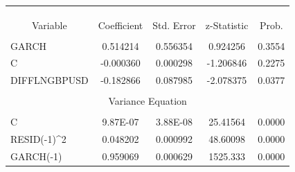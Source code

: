 \documentclass[11pt]{report}
\begin{document}
\begin{table}[!h]
\begin{tabular}{lcccc}
\multicolumn{1}{c}{}           &                                  &                                 &                                  &                            \\
\multicolumn{1}{c}{}           &                                  &                                 &                                  &                            \\
\multicolumn{1}{c}{}           &                                  &                                 &                                  &                            \\ \hline
\multicolumn{1}{|c|}{Variable} & \multicolumn{1}{c|}{Coefficient} & \multicolumn{1}{c|}{Std. Error} & \multicolumn{1}{c|}{z-Statistic} & \multicolumn{1}{c|}{Prob.} \\ \hline
\multicolumn{1}{c}{}           &                                  &                                 &                                  &                            \\
GARCH                          & 0.514214                         & 0.556354                        & 0.924256                         & 0.3554                     \\
C                              & -0.000360                        & 0.000298                        & -1.206846                        & 0.2275                     \\
DIFFLNGBPUSD                   & -0.182866                        & 0.087985                        & -2.078375                        & 0.0377                     \\
                               & \multicolumn{1}{l}{}             & \multicolumn{1}{l}{}            & \multicolumn{1}{l}{}             & \multicolumn{1}{l}{}       \\ \hline
\multicolumn{5}{|c|}{Variance Equation}                                                                                                                             \\ \hline
                               & \multicolumn{1}{l}{}             & \multicolumn{1}{l}{}            & \multicolumn{1}{l}{}             & \multicolumn{1}{l}{}       \\
C                              & 9.87E-07                         & 3.88E-08                        & 25.41564                         & 0.0000                     \\
RESID(-1)\textasciicircum 2    & 0.048202                         & 0.000992                        & 48.60098                         & 0.0000                     \\
GARCH(-1)                      & 0.959069                         & 0.000629                        & 1525.333                         & 0.0000                    
\end{tabular}
\end{table}	
\bigbreak
\end{document}
